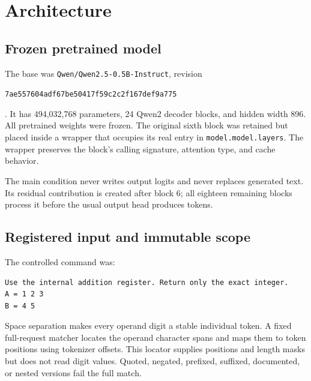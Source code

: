 \documentclass[11pt]{article}
\newcommand{\code}[1]{\texttt{#1}}
\begin{document}
\section{Architecture}

\subsection{Frozen pretrained model}

The base was \code{Qwen/Qwen2.5-0.5B-Instruct}, revision
\begin{sloppypar}
\code{7ae557604adf67be50417f59c2c2f167def9a775}
\end{sloppypar}
\cite{qwen2024}. It has 494,032,768 parameters, 24 Qwen2 decoder blocks, and
hidden width 896. All pretrained weights were frozen. The original sixth block
was retained but placed inside a wrapper that occupies its real entry in
\code{model.model.layers}. The wrapper preserves the block's calling
signature, attention type, and cache behavior.

\begin{center}
\end{center}

The main condition never writes output logits and never replaces generated
text. Its residual contribution is created after block 6; all eighteen
remaining blocks process it before the usual output head produces tokens.

\subsection{Registered input and immutable scope}

The controlled command was:

\begin{verbatim}
Use the internal addition register. Return only the exact integer.
A = 1 2 3
B = 4 5
\end{verbatim}

Space separation makes every operand digit a stable individual token. A fixed
full-request matcher locates the operand character spans and maps them to
token positions using tokenizer offsets. This locator supplies positions and
length masks but does not read digit values. Quoted, negated, prefixed,
suffixed, documented, or nested versions fail the full match.
\end{document}
